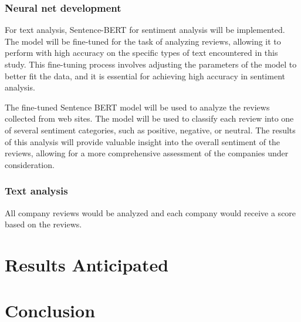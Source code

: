 \documentclass[PI]{ProjectProposal}
\begin{document}
\subsection{Neural net development}
\label{sec:org7e5b767}
For text analysis, Sentence-BERT\autocite{reimers-2019-sentence-bert} for sentiment analysis will be implemented. The model will be fine-tuned for the task of analyzing reviews, allowing it to perform with high accuracy on the specific types of text encountered in this study. This fine-tuning process involves adjusting the parameters of the model to better fit the data, and it is essential for achieving high accuracy in sentiment analysis.

The fine-tuned Sentence BERT model will be used to analyze the reviews collected from web sites. The model will be used to classify each review into one of several sentiment categories, such as positive, negative, or neutral. The results of this analysis will provide valuable insight into the overall sentiment of the reviews, allowing for a more comprehensive assessment of the companies under consideration.
\subsection{Text analysis}
\label{sec:org3444576}
All company reviews would be analyzed and each company would receive a score based on the reviews.
\chapter{Results Anticipated}
\label{sec:org9b6ff73}
\chapter{Conclusion}
\label{sec:orgc297d4e}
\putbibliography
\appendix
\end{document}
